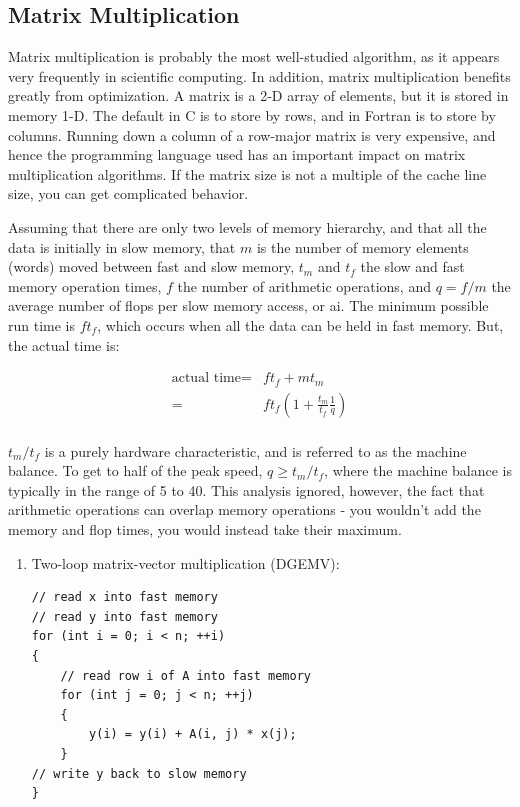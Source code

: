 \documentclass[10pt]{article}
\begin{document}
\begin{flushleft}
\subsection{Matrix Multiplication}

Matrix multiplication is probably the most well-studied algorithm, as it appears very frequently in scientific computing. In addition, matrix multiplication benefits greatly from optimization. A matrix is a 2-D array of elements, but it is stored in memory 1-D. The default in C is to store by rows, and in Fortran is to store by columns. Running down a column of a row-major matrix is very expensive, and hence the programming language used has an important impact on matrix multiplication algorithms. If the matrix size is not a multiple of the cache line size, you can get complicated behavior.

Assuming that there are only two levels of memory hierarchy, and that all the data is initially in slow memory, that \(m\) is the number of memory elements (words) moved between fast and slow memory, \(t_m\) and \(t_f\) the slow and fast memory operation times, \(f\) the number of arithmetic operations, and \(q=f/m\) the average number of flops per slow memory access, or \gls{ai}. The minimum possible run time is \(ft_f\), which occurs when all the data can be held in fast memory. But, the actual time is:

\begin{equation}
\begin{aligned}
\textrm{actual time}=& ft_f+mt_m\\
=& ft_f\left(1+\frac{t_m}{t_f}\frac{1}{q}\right)\\
\end{aligned}
\end{equation}

\(t_m/t_f\) is a purely hardware characteristic, and is referred to as the machine balance. To get to half of the peak speed, \(q\geq t_m/t_f\), where the machine balance is typically in the range of 5 to 40. This analysis ignored, however, the fact that arithmetic operations can overlap memory operations - you wouldn't add the memory and flop times, you would instead take their maximum.

\begin{enumerate}
\item Two-loop matrix-vector multiplication (DGEMV):

\begin{lstlisting}[basicstyle=\ttfamily\small]
// read x into fast memory
// read y into fast memory
for (int i = 0; i < n; ++i)
{
	// read row i of A into fast memory
	for (int j = 0; j < n; ++j)
	{
		y(i) = y(i) + A(i, j) * x(j);
	}
// write y back to slow memory
}
\end{lstlisting}


\end{enumerate}
\end{flushleft}
\end{document}
